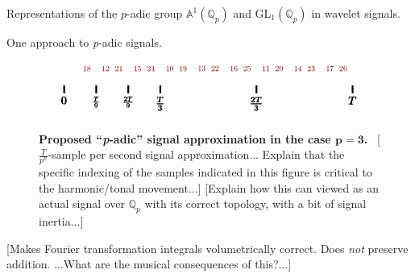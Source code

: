 \documentclass[letterpaper,11pt, reqno]{amsart}
\newtheorem{monodromy theorem}{Monodromy Theorem}[subsection]
\newtheorem{wild conjecture}[theorem]{Wild Conjecture}
\newtheorem{research objectives}{Research objectives}[subsection]
\newtheorem{research question}[theorem]{Research questions}
\newtheorem{aside question}[theorem]{Aside question}
\newtheorem{audio example}[theorem]{\loudspeaker[3] Example}
\newtheorem{blank remark}[theorem]{}
\newtheorem{terminology and comment}[theorem]{Terminology and comment}
\newtheorem{purity hypothesis}[theorem]{Purity hypothesis}
\newtheorem{corollary of the purity hypothesis}[theorem]{Corollary of the purity hypothesis}
\newcommand{\QQ} {{\mathbb Q}}
\numberwithin{equation}{theorem}
\begin{document}
\begin{section}{Representations of the $p$-adic group $\mathbb{A}^{\!1}(\mathbb{Q}_{p})$
and $\text{GL}_{1}(\mathbb{Q}_{p})$
in wavelet signals.}
\begin{subsection}{One approach to {\em p}-adic signals.}
\begin{figure}[ht]
$$\begin{tikzpicture}
	\node[red!50!black!100] at (2/3,.65) {\scalebox{.7}{$\ 18$}};
	\node[red!50!black!100] at (1+1/3,.65) {\scalebox{.7}{$12\ $}};
	\node[red!50!black!100] at (1+2/3,.65) {\scalebox{.7}{$\ 21$}};
	\node[red!50!black!100] at (2+1/3,.65) {\scalebox{.7}{$15\ $}};
	\node[red!50!black!100] at (2+2/3,.65) {\scalebox{.7}{$\ 24$}};
	\node[red!50!black!100] at (3+1/3,.65) {\scalebox{.7}{$10\ $}};
	\node[red!50!black!100] at (3+2/3,.65) {\scalebox{.7}{$\ 19$}};
	\node[red!50!black!100] at (4+1/3,.65) {\scalebox{.7}{$13\ $}};
	\node[red!50!black!100] at (4+2/3,.65) {\scalebox{.7}{$\ 22$}};
	\node[red!50!black!100] at (5+1/3,.65) {\scalebox{.7}{$16\ $}};
	\node[red!50!black!100] at (5+2/3,.65) {\scalebox{.7}{$\ 25$}};
	\node[red!50!black!100] at (6+1/3,.65) {\scalebox{.7}{$11\ $}};
	\node[red!50!black!100] at (6+2/3,.65) {\scalebox{.7}{$\ 20$}};
	\node[red!50!black!100] at (7+1/3,.65) {\scalebox{.7}{$14\ $}};
	\node[red!50!black!100] at (7+2/3,.65) {\scalebox{.7}{$\ 23$}};
	\node[red!50!black!100] at (8+1/3,.65) {\scalebox{.7}{$17\ $}};
	\node[red!50!black!100] at (8+2/3,.65) {\scalebox{.7}{$\ 26$}};
	\draw[black, ultra thick] (0,.125) -- (0,-.125);
	\draw[black, ultra thick] (1,.125) -- (1,-.125);
	\draw[black, ultra thick] (2,.125) -- (2,-.125);
	\draw[black, ultra thick] (3,.125) -- (3,-.125);
	\draw[black, ultra thick] (6,.125) -- (6,-.125);
	\draw[black, ultra thick] (9,.125) -- (9,-.125);
	\node[black] at (0,-.35) {\scalebox{1}{$\pmb{0}$}};
	\node[black] at (1,-.4) {\scalebox{.8}{$\pmb{\frac{T}{9}}$}};
	\node[black] at (2,-.4) {\scalebox{.8}{$\pmb{\frac{2T}{9}}$}};
	\node[black] at (3,-.45) {\scalebox{1}{$\pmb{\frac{T}{3}}$}};
	\node[black] at (6,-.45) {\scalebox{1}{$\pmb{\frac{2T}{3}}$}};
	\node[black] at (9,-.35) {\scalebox{1}{$\pmb{T}$}};
	\end{tikzpicture}
	$$
	\caption{{\bf Proposed ``{\em p}-adic'' signal approximation in the case $\pmb{p=3}$.}\ {\color{red} [$\frac{T}{p^n}$-sample per second signal approximation... Explain that the specific indexing of the samples indicated in this figure is critical to the harmonic/tonal movement...]} {\color{red} [Explain how this can viewed as an actual signal over $\QQ_{p}$ with its correct topology, with a bit of signal inertia...]}}
	\label{figure: p-adic signal proposal}
	\end{figure}
	
{\color{red} [Makes Fourier transformation integrals volumetrically correct. Does {\em not} preserve addition. ...What are the musical consequences of this?...]}

	


\end{subsection}
\end{section}
\end{document}
